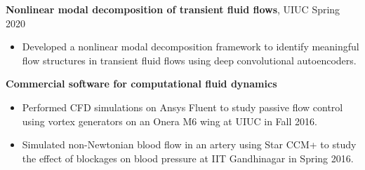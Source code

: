 \documentclass[margin]{res}
\begin{document}
\begin{resume}
{\bf Nonlinear modal decomposition of transient fluid flows}, UIUC \hfill Spring 2020
\begin{itemize}
\item Developed a nonlinear modal decomposition framework to identify meaningful flow structures in transient fluid flows using deep convolutional autoencoders.
\end{itemize}

{\bf Commercial software for computational fluid dynamics}
\begin{itemize}
	\item Performed CFD simulations on Ansys Fluent to study passive flow control using vortex generators on an Onera M6 wing at UIUC in Fall 2016.
	\item Simulated non-Newtonian blood flow in an artery using Star CCM+ to
	study the effect of blockages on blood pressure at IIT Gandhinagar in Spring 2016.
\end{itemize}

		 




\end{resume}
\end{document}
